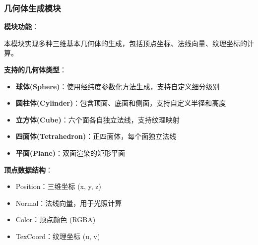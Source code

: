 \documentclass[12pt,a4paper]{article}
\begin{document}
\begin{tcolorbox}
\subsubsection{几何体生成模块}
\textbf{模块功能}：

本模块实现多种三维基本几何体的生成，包括顶点坐标、法线向量、纹理坐标的计算。

\textbf{支持的几何体类型}：
\begin{itemize}
    \item \textbf{球体(Sphere)}：使用经纬度参数化方法生成，支持自定义细分级别
    \item \textbf{圆柱体(Cylinder)}：包含顶面、底面和侧面，支持自定义半径和高度
    \item \textbf{立方体(Cube)}：六个面各自独立法线，支持纹理映射
    \item \textbf{四面体(Tetrahedron)}：正四面体，每个面独立法线
    \item \textbf{平面(Plane)}：双面渲染的矩形平面
\end{itemize}

\textbf{顶点数据结构}：
\begin{itemize}
    \item Position：三维坐标 (x, y, z)
    \item Normal：法线向量，用于光照计算
    \item Color：顶点颜色 (RGBA)
    \item TexCoord：纹理坐标 (u, v)
\end{itemize}
\end{tcolorbox}
\end{document}
